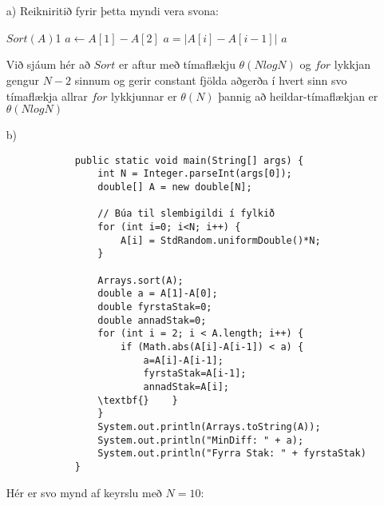 \documentclass{article}
\begin{document}
	\section{}
	
	\begin{itemize}
		\item[a)] Reikniritið fyrir þetta myndi vera svona:
		
		\begin{algorithmic}
			\State $Sort(A)$1
			\State $a \gets A[1]-A[2]$
					\State $a=|A[i]-A[i-1]|$
				\EndIf
			\EndFor
			\State \Return $a$
		\end{algorithmic}
		

		Við sjáum hér að $Sort$ er aftur með tímaflækju $\theta(NlogN)$ og $for$ lykkjan gengur $N-2$ sinnum og gerir constant fjölda aðgerða í hvert sinn svo tímaflækja allrar $for$ lykkjunnar er $\theta(N)$ þannig að heildar-tímaflækjan er $\theta(NlogN)$
		
		\item[b)]
		
		
		
		\begin{verbatim}
			public static void main(String[] args) {
			    int N = Integer.parseInt(args[0]);
			    double[] A = new double[N];
				
			    // Búa til slembigildi í fylkið
			    for (int i=0; i<N; i++) {
			        A[i] = StdRandom.uniformDouble()*N;
			    }
				
			    Arrays.sort(A);
			    double a = A[1]-A[0];
			    double fyrstaStak=0;
			    double annadStak=0;
			    for (int i = 2; i < A.length; i++) {
			        if (Math.abs(A[i]-A[i-1]) < a) {
			            a=A[i]-A[i-1];
			            fyrstaStak=A[i-1];
			            annadStak=A[i];
			    \textbf{}    }
			    }
			    System.out.println(Arrays.toString(A));
			    System.out.println("MinDiff: " + a);
			    System.out.println("Fyrra Stak: " + fyrstaStak)
			}
		\end{verbatim}
		
		Hér er svo mynd af keyrslu með $N=10$:
	\end{itemize}
	
\end{document}
